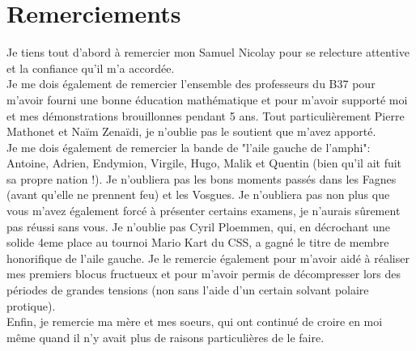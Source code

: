 \documentclass[12pt,a4paper]{article}
\theoremstyle{style-def}
\theoremstyle{style-prop}
\theoremstyle{style-rem}
\begin{document}
\section*{Remerciements}
Je tiens tout d'abord à remercier mon Samuel Nicolay pour se relecture 
attentive et la confiance qu'il m'a accordée.\\
Je me dois également de remercier l'ensemble des professeurs du B37 pour 
m'avoir fourni une bonne éducation mathématique et pour m'avoir supporté 
moi et mes démonstrations brouillonnes pendant 5 ans. Tout particulièrement 
Pierre Mathonet et Naïm Zenaïdi, je n'oublie pas le soutient que m'avez 
apporté.\\
Je me dois également de remercier la bande de "l'aile gauche de l'amphi": Antoine, Adrien, Endymion, Virgile, Hugo, Malik et Quentin (bien qu'il ait fuit sa propre nation !). Je n'oubliera pas les bons moments passés dans les Fagnes (avant qu'elle ne prennent feu) et les Vosgues. Je n'oubliera pas non plus que vous m'avez également forcé à présenter certains examens, je n'aurais sûrement pas réussi sans vous. Je n'oublie pas Cyril Ploemmen, qui, en décrochant une solide 4eme place au tournoi Mario Kart du CSS, a gagné le titre de membre honorifique de l'aile gauche. Je le remercie également pour m'avoir aidé à réaliser mes premiers blocus fructueux et pour m'avoir permis de décompresser lors des périodes de grandes tensions (non sans l'aide d'un certain solvant polaire protique).\\
Enfin, je remercie ma mère et mes soeurs, qui ont continué de croire en moi même quand il n'y avait plus de raisons particulières de le faire. 

\newpage





  





\printbibliography[
  category=utilises,
  title={Références utilisées}
]

\printbibliography[
  category=plusloin,
  title={Pour aller plus loin}
]
\end{document}
